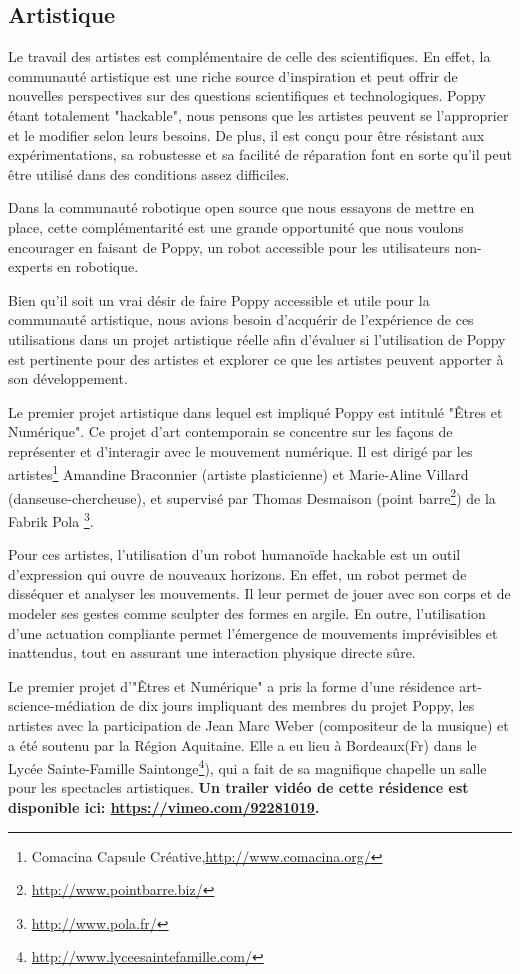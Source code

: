 \subsection*{Artistique} %

Le travail des artistes est complémentaire de celle des scientifiques. En effet, la communauté artistique est une riche source d'inspiration et peut offrir de nouvelles perspectives sur des questions scientifiques et technologiques. 
Poppy étant totalement "hackable", nous pensons que les artistes peuvent se l'approprier et le modifier selon leurs besoins. De plus, il est conçu pour être résistant aux expérimentations, sa robustesse et sa facilité de réparation font en sorte qu'il peut être utilisé dans des conditions assez difficiles.

Dans la communauté robotique open source que nous essayons de mettre en place, cette complémentarité est une grande opportunité que nous voulons encourager en faisant de Poppy, un robot accessible pour les utilisateurs non-experts en robotique.

Bien qu'il soit un vrai désir de faire Poppy accessible et utile pour la communauté artistique, nous avions besoin d'acquérir de l'expérience de ces utilisations dans un projet artistique réelle afin d'évaluer si l'utilisation de Poppy est pertinente pour des artistes et explorer ce que les artistes peuvent apporter à son développement.


Le premier projet artistique dans lequel est impliqué Poppy est intitulé "Êtres et Numérique". Ce projet d'art contemporain se concentre sur les façons de représenter et d'interagir avec le mouvement numérique. Il est dirigé par les artistes\footnote{Comacina Capsule Créative,\url{http://www.comacina.org/}} Amandine Braconnier (artiste plasticienne) et Marie-Aline Villard (danseuse-chercheuse), et supervisé par Thomas Desmaison (point barre\footnote{\url{http://www.pointbarre.biz/}}) de la Fabrik Pola \footnote{\url{http://www.pola.fr/}}.


Pour ces artistes, l'utilisation d'un robot humanoïde hackable est un outil d'expression qui ouvre de nouveaux horizons. En effet, un robot permet de disséquer et analyser les mouvements. Il leur permet de jouer avec son corps et de modeler ses gestes comme sculpter des formes en argile. En outre, l'utilisation d'une actuation compliante permet l'émergence de mouvements imprévisibles et inattendus, tout en assurant une interaction physique directe sûre.

Le premier projet d'"Êtres et Numérique" a pris la forme d'une résidence art-science-médiation de dix jours impliquant des membres du projet Poppy, les artistes avec la participation de Jean Marc Weber (compositeur de la musique) et a été soutenu par la Région Aquitaine. Elle a eu lieu à Bordeaux(Fr) dans le Lycée Sainte-Famille Saintonge\footnote{\url{http://www.lyceesaintefamille.com/}}), qui a fait de sa magnifique chapelle un salle pour les spectacles artistiques. \textbf{Un trailer vidéo de cette résidence est disponible ici: \url{https://vimeo.com/92281019}.}


